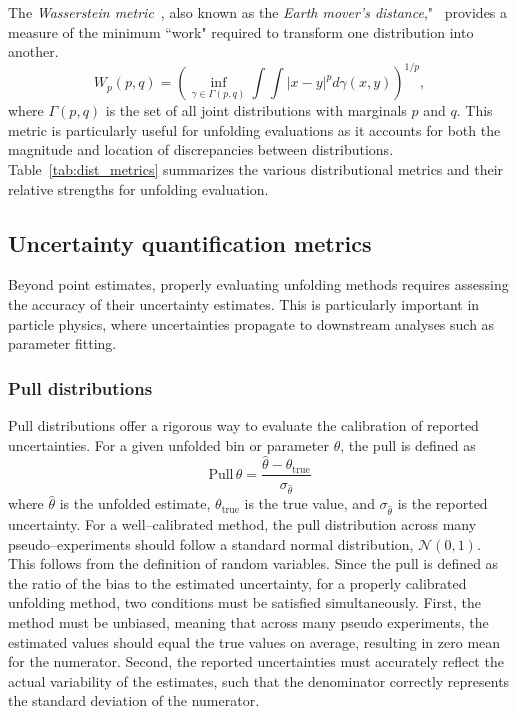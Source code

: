             The \emph{Wasserstein metric}~\cite{L.N.VasersteinIssue3Pagesnobr6472/nobr}, also known as the \emph{Earth mover's distance},"~\cite{rubner_metric_1998} provides a measure of the minimum ``work" required to transform one distribution into another.
        \begin{equation}
            W_p(p, q) = \left(\inf_{\gamma \in \Gamma(p, q)} \int\int |x-y|^p d\gamma(x, y)\right)^{1/p},
        \end{equation}
        where \(\Gamma(p, q)\) is the set of all joint distributions with marginals \(p\) and \(q\).
        This metric is particularly useful for unfolding evaluations as it accounts for both the magnitude and location of discrepancies between distributions.
        Table~\ref{tab:dist_metrics} summarizes the various distributional metrics and their relative strengths for unfolding evaluation.
        
        \subsection{Uncertainty quantification metrics}
        Beyond point estimates, properly evaluating unfolding methods requires assessing the accuracy of their uncertainty estimates. 
        This is particularly important in particle physics, where uncertainties propagate to downstream analyses such as parameter fitting.
        \subsubsection{Pull distributions}
        \label{subsubsec:pull-distributions}
            Pull distributions offer a rigorous way to evaluate the calibration of reported uncertainties.
            For a given unfolded bin or parameter \(\theta\), the pull is defined as
            \begin{equation}
                \text{Pull}\,{\theta} = \frac{\hat{\theta} - \theta_{\text{true}}}{\sigma_{\hat{\theta}}}
            \end{equation}
            where \(\hat{\theta}\) is the unfolded estimate, \(\theta_{\text{true}}\) is the true value, and \(\sigma_{\hat{\theta}}\) is the reported uncertainty.
            For a well--calibrated method, the pull distribution across many pseudo--experiments should follow a standard normal distribution, \(\mathcal{N}(0,1)\).
            This follows from the definition of random variables.
            Since the pull is defined as the ratio of the bias to the estimated uncertainty, for a properly calibrated unfolding method, two conditions must be satisfied simultaneously.
            First, the method must be unbiased, meaning that across many pseudo experiments, the estimated values should equal the true values on average, resulting in zero mean for the numerator.
            Second, the reported uncertainties must accurately reflect the actual variability of the estimates, such that the denominator correctly represents the standard deviation of the numerator.
            
